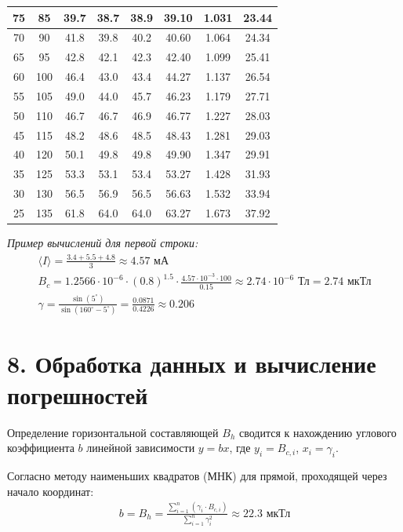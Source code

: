 \documentclass[a4paper,12pt]{article}
\begin{document}
\begin{longtable}{|c|c|c|c|c|c|c|c|}
    75 & 85 & 39.7 & 38.7 & 38.9 & 39.10 & 1.031 & 23.44 \\ \hline
    70 & 90 & 41.8 & 39.8 & 40.2 & 40.60 & 1.064 & 24.34 \\ \hline
    65 & 95 & 42.8 & 42.1 & 42.3 & 42.40 & 1.099 & 25.41 \\ \hline
    60 & 100 & 46.4 & 43.0 & 43.4 & 44.27 & 1.137 & 26.54 \\ \hline
    55 & 105 & 49.0 & 44.0 & 45.7 & 46.23 & 1.179 & 27.71 \\ \hline
    50 & 110 & 46.7 & 46.7 & 46.9 & 46.77 & 1.227 & 28.03 \\ \hline
    45 & 115 & 48.2 & 48.6 & 48.5 & 48.43 & 1.281 & 29.03 \\ \hline
    40 & 120 & 50.1 & 49.8 & 49.8 & 49.90 & 1.347 & 29.91 \\ \hline
    35 & 125 & 53.3 & 53.1 & 53.4 & 53.27 & 1.428 & 31.93 \\ \hline
    30 & 130 & 56.5 & 56.9 & 56.5 & 56.63 & 1.532 & 33.94 \\ \hline
    25 & 135 & 61.8 & 64.0 & 64.0 & 63.27 & 1.673 & 37.92 \\ \hline
\end{longtable}

\textit{Пример вычислений для первой строки:}
\begin{gather*}
    \langle I \rangle = \frac{3.4 + 5.5 + 4.8}{3} \approx 4.57 \text{ мА} \\
    B_c = 1.2566 \cdot 10^{-6} \cdot (0.8)^{1.5} \cdot \frac{4.57 \cdot 10^{-3} \cdot 100}{0.15} \approx 2.74 \cdot 10^{-6} \text{ Тл} = 2.74 \text{ мкТл} \\
    \gamma = \frac{\sin(5^\circ)}{\sin(160^\circ - 5^\circ)} = \frac{0.0871}{0.4226} \approx 0.206
\end{gather*}

\section*{\hspace{30pt}8. Обработка данных и вычисление погрешностей}
Определение горизонтальной составляющей $B_h$ сводится к нахождению углового коэффициента $b$ линейной зависимости $y = bx$, где $y_i = B_{c,i}$, $x_i = \gamma_i$. 

Согласно методу наименьших квадратов (МНК) для прямой, проходящей через начало координат:
\begin{gather*}
    b = B_h = \frac{\sum_{i=1}^{n} (\gamma_i \cdot B_{c,i})}{\sum_{i=1}^{n} \gamma_i^2} \approx 22.3 \text{ мкТл}
\end{gather*}
\end{document}
